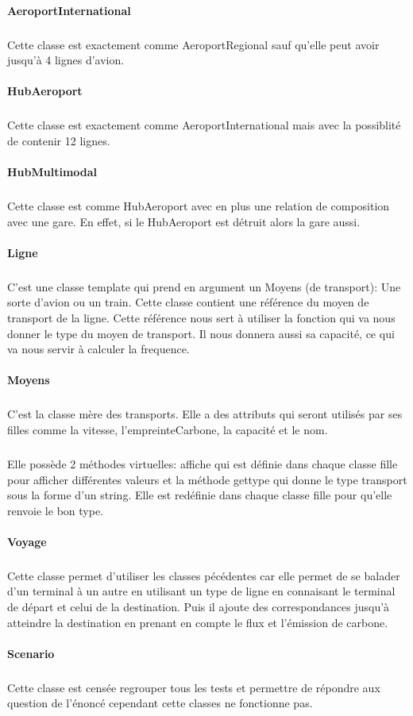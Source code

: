 \documentclass[a4paper]{article}
\begin{document}
\begin{justify}
		\paragraph{AeroportInternational}
		\subparagraph{}Cette classe est exactement comme AeroportRegional sauf qu’elle peut avoir jusqu’à 4 lignes d’avion.
		\paragraph{HubAeroport}
		\subparagraph{}Cette classe est exactement comme AeroportInternational mais avec la possiblité de contenir 12 lignes.
		\paragraph{HubMultimodal}
		\subparagraph{}Cette classe est comme HubAeroport avec en plus une relation de composition avec une gare. En effet, si le HubAeroport est détruit alors la gare aussi.
		\paragraph{Ligne}
		\subparagraph{}C’est une classe template qui prend en argument un Moyens (de transport): Une sorte d’avion ou un train. Cette classe contient une référence du moyen de transport de la ligne. Cette référence nous sert à utiliser la fonction qui va nous donner le type du moyen de transport. Il nous donnera aussi sa capacité, ce qui va nous servir à calculer la frequence.
		\paragraph{Moyens}
		\subparagraph{}C’est la classe mère des transports. Elle a des attributs qui seront utilisés par ses filles comme la vitesse, l’empreinteCarbone, la capacité et le nom.\newline
		\subparagraph{}Elle possède 2 méthodes virtuelles: affiche qui est définie dans chaque classe fille pour afficher différentes valeurs et la méthode gettype qui donne le type transport sous la forme d’un string. Elle est redéfinie dans chaque classe fille pour qu’elle renvoie le bon type.

		\paragraph{Voyage}
		\subparagraph{}Cette classe permet d’utiliser les classes pécédentes car elle permet de se balader d’un terminal à un autre en utilisant un type de ligne en connaisant le terminal de départ et celui de la destination. Puis il ajoute des correspondances jusqu’à atteindre la destination en prenant en compte le flux et l’émission de carbone.
		\paragraph{Scenario}
		\subparagraph{}Cette classe est censée regrouper tous les tests et permettre de répondre aux question de l’énoncé cependant cette classes ne fonctionne pas.
	\end{justify}
\end{document}
